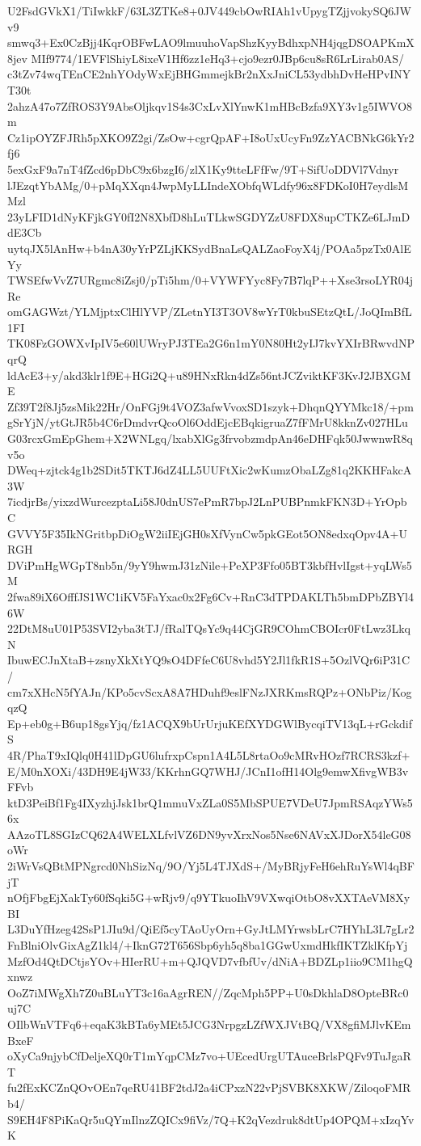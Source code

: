 U2FsdGVkX1/TiIwkkF/63L3ZTKe8+0JV449cbOwRIAh1vUpygTZjjvokySQ6JWv9
smwq3+Ex0CzBjj4KqrOBFwLAO9lmuuhoVapShzKyyBdhxpNH4jqgDSOAPKmX8jev
MIf9774/1EVFlShiyL8ixeV1Hf6zz1eHq3+cjo9ezr0JBp6cu8sR6LrLirab0AS/
c3tZv74wqTEnCE2nhYOdyWxEjBHGmmejkBr2nXxJniCL53ydbhDvHeHPvINYT30t
2ahzA47o7ZfROS3Y9AbsOljkqv1S4s3CxLvXlYnwK1mHBcBzfa9XY3v1g5IWVO8m
Cz1ipOYZFJRh5pXKO9Z2gi/ZsOw+cgrQpAF+I8oUxUcyFn9ZzYACBNkG6kYr2fj6
5exGxF9a7nT4fZcd6pDbC9x6bzgI6/zlX1Ky9tteLFfFw/9T+SifUoDDVl7Vdnyr
lJEzqtYbAMg/0+pMqXXqn4JwpMyLLIndeXObfqWLdfy96x8FDKoI0H7eydlsMMzl
23yLFID1dNyKFjkGY0fI2N8XbfD8hLuTLkwSGDYZzU8FDX8upCTKZe6LJmDdE3Cb
uytqJX5lAnHw+b4nA30yYrPZLjKKSydBnaLsQALZaoFoyX4j/POAa5pzTx0AlEYy
TWSEfwVvZ7URgmc8iZsj0/pTi5hm/0+VYWFYyc8Fy7B7lqP++Xse3rsoLYR04jRe
omGAGWzt/YLMjptxClHlYVP/ZLetnYI3T3OV8wYrT0kbuSEtzQtL/JoQImBfL1FI
TK08FzGOWXvIpIV5e60lUWryPJ3TEa2G6n1mY0N80Ht2yIJ7kvYXIrBRwvdNPqrQ
ldAcE3+y/akd3klr1f9E+HGi2Q+u89HNxRkn4dZs56ntJCZviktKF3KvJ2JBXGME
Zf39T2f8Jj5zsMik22Hr/OnFGj9t4VOZ3afwVvoxSD1szyk+DhqnQYYMkc18/+pm
gSrYjN/ytGtJR5b4C6rDmdvrQcoOl6OddEjcEBqkigruaZ7fFMrU8kknZv027HLu
G03rcxGmEpGhem+X2WNLgq/lxabXlGg3frvobzmdpAn46eDHFqk50JwwnwR8qv5o
DWeq+zjtck4g1b2SDit5TKTJ6dZ4LL5UUFtXic2wKumzObaLZg81q2KKHFakcA3W
7icdjrBs/yixzdWurcezptaLi58J0dnUS7ePmR7bpJ2LnPUBPnmkFKN3D+YrOpbC
GVVY5F35IkNGritbpDiOgW2iiIEjGH0sXfVynCw5pkGEot5ON8edxqOpv4A+URGH
DViPmHgWGpT8nb5n/9yY9hwmJ31zNile+PeXP3Ffo05BT3kbfHvlIgst+yqLWs5M
2fwa89iX6OfffJS1WC1iKV5FaYxac0x2Fg6Cv+RnC3dTPDAKLTh5bmDPbZBYl46W
22DtM8uU01P53SVI2yba3tTJ/fRalTQsYc9q44CjGR9COhmCBOIcr0FtLwz3LkqN
IbuwECJnXtaB+zsnyXkXtYQ9sO4DFfeC6U8vhd5Y2Jl1fkR1S+5OzlVQr6iP31C/
cm7xXHcN5fYAJn/KPo5cvScxA8A7HDuhf9eslFNzJXRKmsRQPz+ONbPiz/KogqzQ
Ep+eb0g+B6up18gsYjq/fz1ACQX9bUrUrjuKEfXYDGWlBycqiTV13qL+rGckdifS
4R/PhaT9xIQlq0H41lDpGU6lufrxpCspn1A4L5L8rtaOo9cMRvHOzf7RCRS3kzf+
E/M0nXOXi/43DH9E4jW33/KKrhnGQ7WHJ/JCnI1ofH14Olg9emwXfivgWB3vFFvb
ktD3PeiBf1Fg4IXyzhjJsk1brQ1mmuVxZLa0S5MbSPUE7VDeU7JpmRSAqzYWs56x
AAzoTL8SGIzCQ62A4WELXLfvlVZ6DN9yvXrxNos5Nse6NAVxXJDorX54leG08oWr
2iWrVsQBtMPNgrcd0NhSizNq/9O/Yj5L4TJXdS+/MyBRjyFeH6ehRuYsWl4qBFjT
nOfjFbgEjXakTy60fSqki5G+wRjv9/q9YTkuoIhV9VXwqiOtbO8vXXTAeVM8XyBI
L3DuYfHzeg42SsP1JIu9d/QiEf5cyTAoUyOrn+GyJtLMYrwsbLrC7HYhL3L7gLr2
FnBlniOlvGixAgZ1kl4/+IknG72T656Sbp6yh5q8ba1GGwUxmdHkfIKTZklKfpYj
MzfOd4QtDCtjsYOv+HIerRU+m+QJQVD7vfbfUv/dNiA+BDZLp1iio9CM1hgQxnwz
OoZ7iMWgXh7Z0uBLuYT3c16aAgrREN//ZqcMph5PP+U0sDkhlaD8OpteBRc0uj7C
OIlbWnVTFq6+eqaK3kBTa6yMEt5JCG3NrpgzLZfWXJVtBQ/VX8gfiMJlvKEmBxeF
oXyCa9njybCfDeljeXQ0rT1mYqpCMz7vo+UEcedUrgUTAuceBrlsPQFv9TuJgaRT
fu2fExKCZnQOvOEn7qeRU41BF2tdJ2a4iCPxzN22vPjSVBK8XKW/ZiloqoFMRb4/
S9EH4F8PiKaQr5uQYmIlnzZQICx9fiVz/7Q+K2qVezdruk8dtUp4OPQM+xIzqYvK
